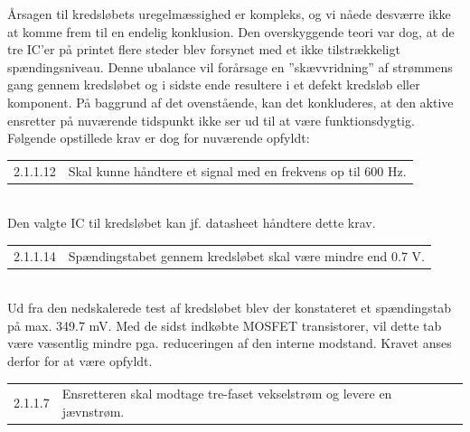 Årsagen til kredsløbets uregelmæssighed er kompleks, og vi nåede desværre ikke at komme frem til en endelig konklusion. Den overskyggende teori var dog, at de tre IC’er på printet flere steder blev forsynet med et ikke tilstrækkeligt spændingsniveau. Denne ubalance vil forårsage en ”skævvridning” af strømmens gang gennem kredsløbet og i sidste ende resultere i et defekt kredsløb eller komponent.  
På baggrund af det ovenstående, kan det konkluderes, at den aktive ensretter på nuværende tidspunkt ikke ser ud til at være funktionsdygtig. Følgende opstillede krav er dog for nuværende opfyldt:\\

\vspace{1em}
\begin{tabular}[h]{ll}
2.1.1.12&Skal kunne håndtere et signal med en frekvens op til 600 Hz.\vspace{0.5em}\\
\end{tabular}
\vspace{1em}\\


Den valgte IC til kredsløbet kan jf. datasheet håndtere dette krav.\\

\vspace{1em}
\begin{tabular}[h]{ll}
2.1.1.14&Spændingstabet gennem kredsløbet skal være mindre end 0.7 V.\vspace{0.5em}\\
\end{tabular}
\vspace{1em}\\


Ud fra den nedskalerede test af kredsløbet blev der konstateret et spændingstab på max. 349.7 mV. Med de sidst indkøbte MOSFET transistorer, vil dette tab være væsentlig mindre pga. reduceringen af den interne modstand. Kravet anses derfor for at være opfyldt.\\

\vspace{1em}
\begin{tabular}[h]{ll}
2.1.1.7&Ensretteren skal modtage tre-faset vekselstrøm og levere en jævnstrøm.\vspace{0.5em}\\
\end{tabular}
\vspace{1em}\\


